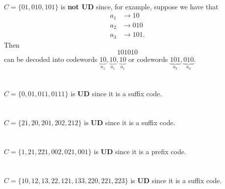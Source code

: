 \documentclass[
  coursecode={MTHE 474},
  assignmentname={Homework \homeworknumber},
  studentnumber=20053722,
  name={Bryan Hoang},
  draft,
]{
  ltxanswer%
}
\begin{document}
  \begin{questions}
    \setcounter{question}{\questionnumber}
    \addtocounter{question}{-1}
    \question[10]\
    \begin{parts}
      \part{}
      \begin{solution}
        \(C=\{01,010,101\}\) is \textbf{not UD} since, for example, suppose we have that
        \begin{align*}
          a_{1} &\to 10   \\
          a_{2} &\to 010  \\
          a_{3} &\to 101.
        \end{align*}
        Then
        \begin{equation*}
          101010
        \end{equation*}
        can be decoded into codewords \(\underbrace{10}_{a_{1}},\underbrace{10}_{a_{1}},\underbrace{10}_{a_{1}}\) or codewords \(\underbrace{101}_{a_{3}},\underbrace{010}_{a_{2}}\).
      \end{solution}

      \part{}
      \begin{solution}
        \(C=\{0,01,011,0111\}\) is \textbf{UD} since it is a suffix code.
      \end{solution}

      \part{}
      \begin{solution}
        \(C=\{21,20,201,202,212\}\) is \textbf{UD} since it is a suffix code.
      \end{solution}

      \part{}
      \begin{solution}
        \(C=\{1,21,221,002,021,001\}\) is \textbf{UD} since it is a prefix code.
      \end{solution}

      \part{}
      \begin{solution}
        \(C=\{10,12,13,22,121,133,220,221,223\}\) is \textbf{UD} since it is a suffix code.
      \end{solution}
    \end{parts}
  \end{questions}
\end{document}
